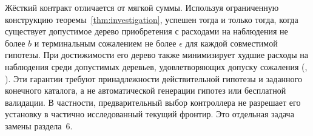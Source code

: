 Жёсткий контракт отличается от мягкой суммы. Используя ограниченную конструкцию теоремы~\ref{thm:investigation},  успешен тогда и только тогда, когда существует допустимое дерево приобретения с расходами на наблюдения не более $b$ и терминальным сожалением не более $\epsilon$ для каждой совместимой гипотезы. При достижимости его дерево также минимизирует худшие расходы на наблюдения среди допустимых деревьев, удовлетворяющих допуску сожаления (, ). Эти гарантии требуют принадлежности действительной гипотезы и заданного конечного каталога, а не автоматической генерации гипотез или бесплатной валидации. В частности, предварительный выбор контроллера не разрешает его установку в частично исследованный текущий фронтир. Это отдельная задача замены раздела~6.
